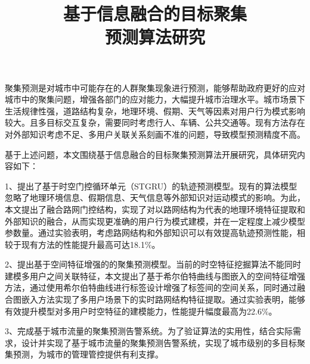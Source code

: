 \documentclass[master]{thesis-uestc}
\title{基于信息融合的目标聚集\\预测算法研究}{Research on Target Gather Prediction Algorithm based on Information Fusion}
\author{}{}
\begin{document}
\makecover
\begin{chineseabstract}
聚集预测是对城市中可能存在的人群聚集现象进行预测，能够帮助政府更好的应对城市中的聚集问题，增强各部门的应对能力，大幅提升城市治理水平。城市场景下生活规律性强，道路结构复杂，地理环境、假期、天气等因素对用户行为模式影响较大。且多目标交互复杂，需要同时考虑行人、车辆、公共交通等。现有方法存在对外部知识考虑不足、多用户关联关系刻画不准的问题，导致模型预测精度不高。

基于上述问题，本文围绕基于信息融合的目标聚集预测算法开展研究，具体研究内容如下：

1、提出了基于时空门控循环单元（STGRU）的轨迹预测模型。现有的算法模型忽略了地理环境信息、假期信息、天气信息等外部知识对运动模式的影响。为此，本文提出了融合路网门控结构，实现了对以路网结构为代表的地理环境特征提取和外部知识的融合，从而实现更准确的用户行为模式建模，并在一定程度上减少模型参数量。通过实验表明，考虑路网结构和外部知识可以有效提高轨迹预测性能，相较于现有方法的性能提升最高可达18.1$\%$。

2、提出基于空间特征增强的的聚集预测模型。当前的时空特征挖掘算法不能同时建模多用户之间关联特征，本文提出了基于希尔伯特曲线与图嵌入的空间特征增强方法，通过使用希尔伯特曲线进行标签设计增强了标签间的空间关系，同时通过融合图嵌入方法实现了多用户场景下的实时路网结构特征提取。通过实验表明，能够有效提升模型对多用户时空特征的建模能力，性能提升幅度最高为22.6$\%$。

3、完成基于城市流量的聚集预测告警系统。为了验证算法的实用性，结合实际需求，设计并实现了基于城市流量的聚集预测告警系统，实现了城市级别的多目标聚集预测，为城市的管理管控提供有利支撑。

\end{chineseabstract}
\end{document}
